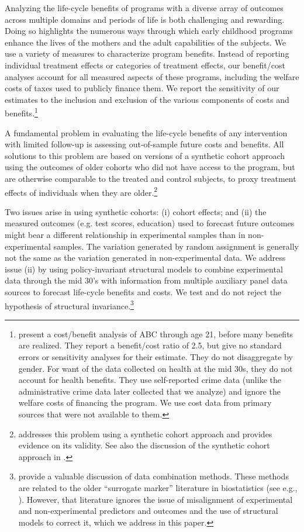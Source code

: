 Analyzing the life-cycle benefits of programs with a diverse array of outcomes across multiple domains and periods of life is both challenging and rewarding. Doing so highlights the numerous ways through which early childhood programs enhance the lives of the mothers and the adult capabilities of the subjects. We use a variety of measures to characterize program benefits. Instead of reporting individual treatment effects or categories of treatment effects, our benefit/cost analyses account for all measured aspects of these programs, including the welfare costs of taxes used to publicly finance them. We report the sensitivity of our estimates to the inclusion and exclusion of the various components of costs and benefits.\footnote{\cite{Barnett_Masse_2002_benefitcost,Barnett_Masse_2007_EER} present a cost/benefit analysis of ABC through age 21, before many benefits are realized. They report a benefit/cost ratio of 2.5, but give no standard errors or sensitivity analyses for their estimate. They do not disaggregate by gender. For want of the data collected on health at the mid 30s, they do not account for health benefits. They use self-reported crime data (unlike the administrative crime data later collected that we analyze) and ignore the welfare costs of financing the program. We use cost data from primary sources that were not available to them.}

A fundamental problem in evaluating the life-cycle benefits of any intervention with limited follow-up is assessing out-of-sample future costs and benefits. All solutions to this problem are based on versions of a synthetic cohort approach using the outcomes of older cohorts who did not have access to the program, but are otherwise comparable to the treated and control subjects, to proxy treatment effects of individuals when they are older.\footnote{\cite{Mincer_1974_schooling} addresses this problem using a synthetic cohort approach and provides evidence on its validity. See also the discussion of the synthetic cohort approach in \cite{Heckman_Lochner_ea_2006_HEE}.}

Two issues arise in using  synthetic cohorts: (i) cohort effects; and (ii) the measured outcomes (e.g. test scores, education) used to forecast future outcomes might bear a different relationship in experimental samples than in non-experimental samples. The variation generated by random assignment is generally not the same as the variation generated in non-experimental data. We address issue (ii) by using policy-invariant structural models to combine experimental data through the mid 30's with information from multiple auxiliary panel data sources to forecast life-cycle benefits and costs. We test and do not reject the hypothesis of structural invariance.\footnote{\citet{Ridder_Moffitt_2007_hbk_metricsdata} provide a valuable discussion of data combination methods. These methods are related to the older ``surrogate marker'' literature in biostatistics (see e.g., \citealp{Prentice_1989_Surrogate_SiM}). However, that literature ignores the issue of misalignment of experimental and non-experimental predictors and outcomes and the use of structural models to correct it, which we address in this paper.}

